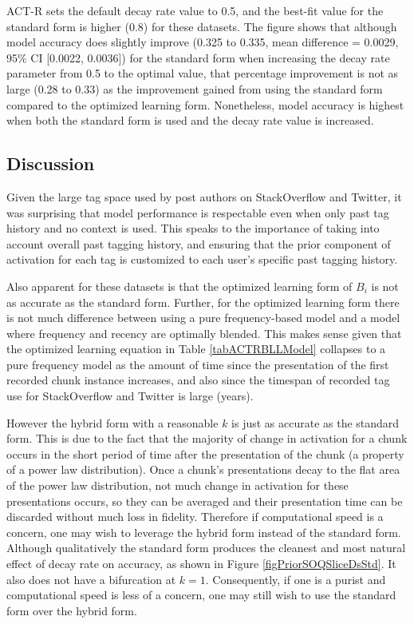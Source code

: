 \documentclass[man,floatsintext,donotrepeattitle]{apa6}
\newcommand{\myCI}[4]{{mean difference = \num{#1}, 95\% CI [\num{#2}, \num{#3}]}}
\begin{document}
ACT-R sets the default decay rate value to \num{0.5}, and the best-fit value for the standard form is higher (\num{0.8}) for these datasets.
The figure shows that although model accuracy does slightly improve (\num{0.325} to \num{0.335}, \myCI{.0029}{.0022}{.0036}{3609}) for the standard form when increasing the decay rate parameter from \num{0.5} to the optimal value,
that percentage improvement is not as large (\num{0.28} to \num{0.33}) as the improvement gained from using the standard form compared to the optimized learning form.
Nonetheless, model accuracy is highest when both the standard form is used and the decay rate value is increased. 

\subsection{Discussion}

Given the large tag space used by post authors on StackOverflow and Twitter, it was surprising that model performance is respectable even when only past tag history and no context is used.
This speaks to the importance of taking into account overall past tagging history, and ensuring that the prior component of activation for each tag is customized to each user's specific past tagging history.

Also apparent for these datasets is that the optimized learning form of $B_{i}$ is not as accurate as the standard form.
Further, for the optimized learning form there is not much difference between using a pure frequency-based model and a model where frequency and recency are optimally blended.
This makes sense given that the optimized learning equation in Table \ref{tabACTRBLLModel} collapses to a pure frequency model as the amount of time since the presentation of the first recorded chunk instance increases,
and also since the timespan of recorded tag use for StackOverflow and Twitter is large (years).

However the hybrid form with a reasonable $k$ is just as accurate as the standard form.
This is due to the fact that the majority of change in activation for a chunk occurs in the short period of time after the presentation of the chunk (a property of a power law distribution).
Once a chunk's presentations decay to the flat area of the power law distribution, not much change in activation for these presentations occurs, so they can be averaged and their presentation time can be discarded without much loss in fidelity.
Therefore if computational speed is a concern, one may wish to leverage the hybrid form instead of the standard form.
Although qualitatively the standard form produces the cleanest and most natural effect of decay rate on accuracy, as shown in Figure \ref{figPriorSOQSliceDsStd}.
It also does not have a bifurcation at $k=1$.
Consequently, if one is a purist and computational speed is less of a concern, one may still wish to use the standard form over the hybrid form.
\end{document}
